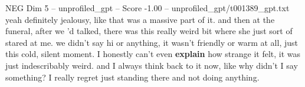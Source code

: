 \begin{textsample}{NEG Dim 5 – unprofiled\_gpt – Score -1.00 – unprofiled\_gpt/t001389\_gpt.txt}  \label{ex:f5_neg_008}
yeah definitely jealousy, like that was a massive part of it. and then at the funeral, after we ’d talked, there was this really weird bit where she just sort of stared at me. we didn't say hi or anything, it wasn't friendly or warm at all, just this cold, silent moment.
I honestly can't even \textbf{explain} how strange it felt, it was just indescribably weird. and I always think back to it now, like why didn't I say something?
I really regret just standing there and not doing anything.

\end{textsample}

